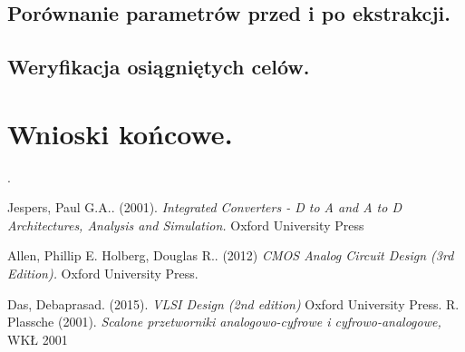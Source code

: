 \documentclass[10pt,a4paper]{report}
\begin{document}
	\section{Porównanie parametrów przed i po ekstrakcji.}
	\section{Weryfikacja osiągniętych celów.}
	
	\chapter{Wnioski końcowe.}
	
	\appendix
.
	\begin{thebibliography}{9}
		Jespers, Paul G.A.. (2001). 
		\textit{Integrated Converters - D to A and A to D Architectures, Analysis and Simulation.}
		Oxford University Press
		
		Allen, Phillip E. Holberg, Douglas R.. (2012)  
		\textit{CMOS Analog Circuit Design (3rd Edition). }
		Oxford University Press.
		
		Das, Debaprasad. (2015).
		\textit{VLSI Design (2nd edition)}
		Oxford University Press.
		R. Plassche (2001). 
		\textit{Scalone przetworniki analogowo-cyfrowe i cyfrowo-analogowe,}
		WKŁ 2001
	\end{thebibliography}
\end{document}
